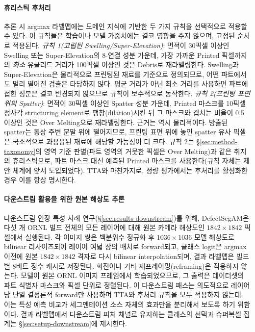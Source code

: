 \paragraph{휴리스틱 후처리}
추론 시 argmax 라벨맵에는 도메인 지식에 기반한 두 가지 규칙을
선택적으로 적용할 수 있다. 이 규칙들은 학습이나 모델 가중치에는 결코
영향을 주지 않으며, 고정된 순서로 적용된다. \emph{규칙 1(고립된
Swelling/Super-Elevation)}: 면적이 30픽셀 이상인 Swelling 또는
Super-Elevation의 8-연결 성분 가운데, 가장 가까운 Printed 픽셀까지의
\emph{최소} 유클리드 거리가 100픽셀 이상인 것은 Debris로 재라벨링한다.
Swelling과 Super-Elevation은 물리적으로 프린팅된 재료를 기준으로
정의되므로, 어떤 파트에서도 멀리 떨어진 검출은 타당하지 않다. 평균
거리가 아닌 최소 거리를 사용하면 파트에 접한 성분은 결코 변경되지
않으므로 규칙이 보수적으로 동작한다. \emph{규칙 2(프린팅 표면 위의
Spatter)}: 면적이 30픽셀 이상인 Spatter 성분 가운데, Printed 마스크를
10픽셀 정사각 structuring element로 팽창(dilation)시킨 뒤 그 마스크와
겹치는 비율이 0.5 이상인 것은 Over Melting으로 재라벨링한다. 근거는
역시 물리적이다. 방출된 spatter는 통상 주변 분말 위에 떨어지므로,
프린팅 표면 위에 놓인 spatter 유사 픽셀은 국소적으로 과용융된 재료에
해당할 가능성이 더 크다. 규칙 2는 \S\ref{sec:method-taxonomy}의 영역
기준 판별(파트 영역의 거뭇한 픽셀은 Over Melting)과 같은 취지의
휴리스틱으로, 파트 마스크 대신 예측된 Printed 마스크를 사용한다(규칙
자체는 제안 체계에 앞서 도입되었다). TTA와 마찬가지로, 정량 평가에서는
후처리를 활성화한 경우 이를 항상 명시한다.

\paragraph{다운스트림 활용을 위한 원본 해상도 추론}
다운스트림 인장 특성 사례 연구(\S\ref{sec:results-downstream})를
위해, DefectSegAM은 다섯 개 ORNL 빌드 전체의 모든 레이어에 대해 원본
카메라 해상도인 $1842 \times 1842$ 픽셀에서 실행된다. 각 이미지 쌍은
백분위수 정규화 후 $1036 \times 1036$ 모델 해상도로 bilinear
리사이즈되어 레이어 여덟 장의 배치로 forward되고, 클래스 logit은
argmax 이전에 원본 $1842 \times 1842$ 격자로 다시 bilinear
interpolation되며, 결과 라벨맵은 빌드별 8비트 정수 캐시로 저장된다.
회전이나 기타 재프레이밍(reframing)은 적용하지 않는다. 모델이 원본
ORNL 이미지 프레임에서 학습되었으므로, 그 출력은 데이터셋의 파트
식별자 마스크와 픽셀 단위로 정렬된다. 이 다운스트림 패스는 의도적으로
레이어당 단일 결정론적 forward만 사용하며 TTA와 후처리 규칙을 모두
적용하지 않는데, 이는 특성 예측 비교가 세그멘테이션 소스 자체의
효과만을 분리해서 보도록 하기 위함이다. 결과 라벨맵에서 다운스트림
피처 채널로 유지하는 클래스의 선택과 슈퍼복셀 집계는
\S\ref{sec:setup-downstream}에 제시한다.
